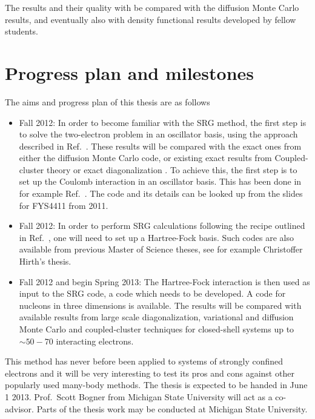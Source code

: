 \documentclass[twocolumn]{revtex4}
\begin{document}
The results and their quality with be compared with the diffusion Monte Carlo results, and eventually also
with density functional results developed by fellow students.

\section*{Progress plan and milestones}
The aims and progress plan of this thesis are as follows
\begin{itemize}
\item Fall 2012: In order to become familiar with the SRG method, the first step is to solve 
the two-electron problem in an oscillator basis, using the approach described in Ref.~\cite{bognerSRG}. 
These results will be compared with the exact ones from either the diffusion Monte Carlo code, or existing
exact results from Coupled-cluster theory or exact diagonalization \cite{us2011}.  To achieve this, the first step is to
set up the Coulomb interaction in an oscillator basis. This has been done in for example Ref.~\cite{us2011}. The code
and its details can be looked up from the slides for FYS4411 from 2011. 
\item Fall 2012: In order to perform SRG calculations following the recipe outlined in Ref.~\cite{srgscott}, one will need to set up a Hartree-Fock basis. Such codes are also available from previous Master of Science theses, see for example
Christoffer Hirth's thesis. 
\item Fall 2012 and begin Spring 2013: The Hartree-Fock interaction is then used as input to the SRG code, a code which needs to be developed.  
A code for nucleons in three dimensions is available. 
The results will be compared with available results from large scale diagonalization, variational and diffusion Monte Carlo  and coupled-cluster
techniques for closed-shell systems up to  $\sim 50-70$ interacting electrons. 

\end{itemize}
This method has never before been applied to systems of strongly confined electrons and it will be very interesting to 
test its pros and cons against other popularly used many-body methods.  
The thesis is expected to be handed in June 1 2013. Prof.~Scott Bogner from Michigan State University will act as a co-advisor. Parts of the thesis work may be conducted at Michigan State University. 
\end{document}
